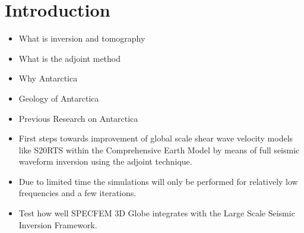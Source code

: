

\chapter{Introduction}



\begin{itemize}
\item What is inversion and tomography 
\item What is the adjoint method
\item Why Antarctica
\item Geology of Antarctica
\item Previous Research on Antarctica
\item First steps towards improvement of global scale shear wave velocity models like S20RTS within the Comprehensive Earth Model by means of full seismic waveform inversion using the adjoint technique. 
\item Due to limited time the simulations will only be performed for relatively low frequencies and a few iterations.
\item Test how well SPECFEM 3D Globe integrates with the Large Scale Seismic Inversion Framework.
\end{itemize}
